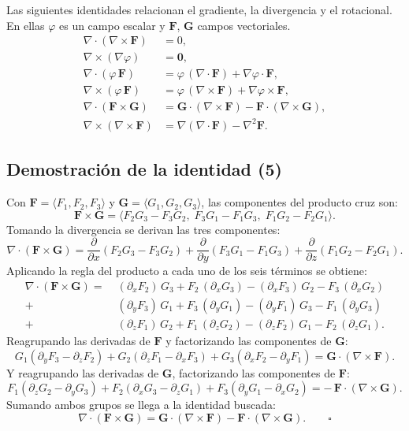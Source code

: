 Las siguientes identidades relacionan el gradiente, la divergencia y el rotacional. En ellas $\varphi$ es un campo escalar y $\mathbf{F}$, $\mathbf{G}$ campos vectoriales.
\begin{align}
\nabla \cdot (\nabla \times \mathbf{F}) &= 0, \\
\nabla \times (\nabla \varphi) &= \mathbf{0}, \\
\nabla \cdot (\varphi\, \mathbf{F}) &= \varphi\, (\nabla \cdot \mathbf{F}) + \nabla \varphi \cdot \mathbf{F}, \\
\nabla \times (\varphi\, \mathbf{F}) &= \varphi\, (\nabla \times \mathbf{F}) + \nabla \varphi \times \mathbf{F}, \\
\nabla \cdot (\mathbf{F} \times \mathbf{G}) &= \mathbf{G} \cdot (\nabla \times \mathbf{F}) - \mathbf{F} \cdot (\nabla \times \mathbf{G}), \\
\nabla \times (\nabla \times \mathbf{F}) &= \nabla (\nabla \cdot \mathbf{F}) - \nabla^2 \mathbf{F}.
\end{align}

\subsection{Demostración de la identidad (5)}

Con $\mathbf{F} = \langle F_1, F_2, F_3 \rangle$ y $\mathbf{G} = \langle G_1, G_2, G_3 \rangle$, las componentes del producto cruz son:
\[
\mathbf{F} \times \mathbf{G} = \langle F_2 G_3 - F_3 G_2,\; F_3 G_1 - F_1 G_3,\; F_1 G_2 - F_2 G_1 \rangle.
\]
Tomando la divergencia se derivan las tres componentes:
\[
\nabla \cdot (\mathbf{F} \times \mathbf{G})
= \frac{\partial}{\partial x}(F_2 G_3 - F_3 G_2)
+ \frac{\partial}{\partial y}(F_3 G_1 - F_1 G_3)
+ \frac{\partial}{\partial z}(F_1 G_2 - F_2 G_1).
\]
Aplicando la regla del producto a cada uno de los seis términos se obtiene:
\[
\begin{aligned}
\nabla \cdot (\mathbf{F} \times \mathbf{G}) =\;
& (\partial_x F_2)\,G_3 + F_2\,(\partial_x G_3) - (\partial_x F_3)\,G_2 - F_3\,(\partial_x G_2) \\
+\; & (\partial_y F_3)\,G_1 + F_3\,(\partial_y G_1) - (\partial_y F_1)\,G_3 - F_1\,(\partial_y G_3) \\
+\; & (\partial_z F_1)\,G_2 + F_1\,(\partial_z G_2) - (\partial_z F_2)\,G_1 - F_2\,(\partial_z G_1).
\end{aligned}
\]
Reagrupando las derivadas de $\mathbf{F}$ y factorizando las componentes de $\mathbf{G}$:
\[
G_1(\partial_y F_3 - \partial_z F_2) + G_2(\partial_z F_1 - \partial_x F_3) + G_3(\partial_x F_2 - \partial_y F_1)
= \mathbf{G} \cdot (\nabla \times \mathbf{F}).
\]
Y reagrupando las derivadas de $\mathbf{G}$, factorizando las componentes de $\mathbf{F}$:
\[
F_1(\partial_z G_2 - \partial_y G_3) + F_2(\partial_x G_3 - \partial_z G_1) + F_3(\partial_y G_1 - \partial_x G_2)
= -\,\mathbf{F} \cdot (\nabla \times \mathbf{G}).
\]
Sumando ambos grupos se llega a la identidad buscada:
\[
\nabla \cdot (\mathbf{F} \times \mathbf{G}) = \mathbf{G} \cdot (\nabla \times \mathbf{F}) - \mathbf{F} \cdot (\nabla \times \mathbf{G}). \qquad \square
\]


